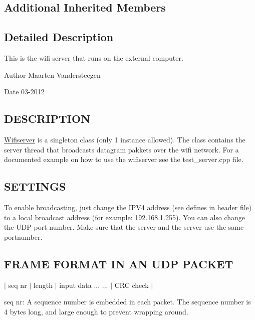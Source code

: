 \subsection*{Additional Inherited Members}


\subsection{Detailed Description}
This is the wifi server that runs on the external computer. 

\begin{DoxyAuthor}{Author}
Maarten Vandersteegen 
\end{DoxyAuthor}
\begin{DoxyDate}{Date}
03-\/2012
\end{DoxyDate}
\hypertarget{class_wifiserver_DESCRIPTION}{}\subsection{D\-E\-S\-C\-R\-I\-P\-T\-I\-O\-N}\label{class_wifiserver_DESCRIPTION}
\hyperlink{class_wifiserver}{Wifiserver} is a singleton class (only 1 instance allowed). The class contains the server thread that broadcasts datagram pakkets over the wifi network. For a documented example on how to use the wifiserver see the test\-\_\-server.\-cpp file.\hypertarget{class_wifiserver_NETWORK}{}\subsection{S\-E\-T\-T\-I\-N\-G\-S}\label{class_wifiserver_NETWORK}
\begin{DoxyVerb} To enable broadcasting, just change the IPV4 address (see defines in header file) to a local
 broadcast address (for example: 192.168.1.255). You can also change the UDP port number.
 Make sure that the server and the server use the same portnumber.
\end{DoxyVerb}
\hypertarget{class_wifiserver_COMMUNICATION}{}\subsection{F\-R\-A\-M\-E F\-O\-R\-M\-A\-T I\-N A\-N U\-D\-P P\-A\-C\-K\-E\-T}\label{class_wifiserver_COMMUNICATION}


 $|$ seq nr $|$ length $|$ input data ... ... $|$ C\-R\-C check $|$


\begin{DoxyItemize}
\item seq nr\-: A sequence number is embedded in each packet. The sequence number is 4 bytes long, and large enough to prevent wrapping around.
\end{DoxyItemize}


